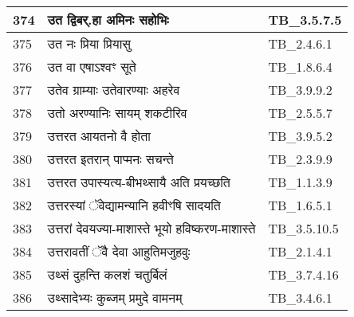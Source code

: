 \documentclass[17pt]{extarticle}
\begin{document}
\begin{longtable}{||p{0.4in}||p{4.9in}||p{0.9in}||}
    374 & उत द्विबर्.हा अमिनः सहोभिः & TB\_3.5.7.5       \\
    
    \hline
        
    375 & उत नः प्रिया प्रियासु & TB\_2.4.6.1       \\
    
    \hline
        
    376 & उत वा एषाऽश्वꣳ सूते & TB\_1.8.6.4       \\
    
    \hline
        
    377 & उतेव ग्राम्याः उतेवारण्याः अहरेव & TB\_3.9.9.2       \\
    
    \hline
        
    378 & उतो अरण्यानिः सायम् शकटीरिव & TB\_2.5.5.7       \\
    
    \hline
        
    379 & उत्तरत आयतनो वै होता & TB\_3.9.5.2       \\
    
    \hline
        
    380 & उत्तरत इतरान् पाप्मनः सचन्ते & TB\_2.3.9.9       \\
    
    \hline
        
    381 & उत्तरत उपास्यत्य{-}बीभथ्सायै अति प्रयच्छति & TB\_1.1.3.9       \\
    
    \hline
        
    382 & उत्तरस्यां ॅवेद्यामन्यानि हवीꣳषि सादयति & TB\_1.6.5.1       \\
    
    \hline
        
    383 & उत्तरां देवयज्या{-}माशास्ते भूयो हविष्करण{-}माशास्ते & TB\_3.5.10.5       \\
    
    \hline
        
    384 & उत्तरावतीं ॅवै देवा आहुतिमजुहवुः & TB\_2.1.4.1       \\
    
    \hline
        
    385 & उथ्सं दुहन्ति कलशं चतुर्बिलं & TB\_3.7.4.16       \\
    
    \hline
        
    386 & उथ्सादेभ्यः कुब्जम् प्रमुदे वामनम् & TB\_3.4.6.1       \\
    

\end{longtable}
\end{document}
